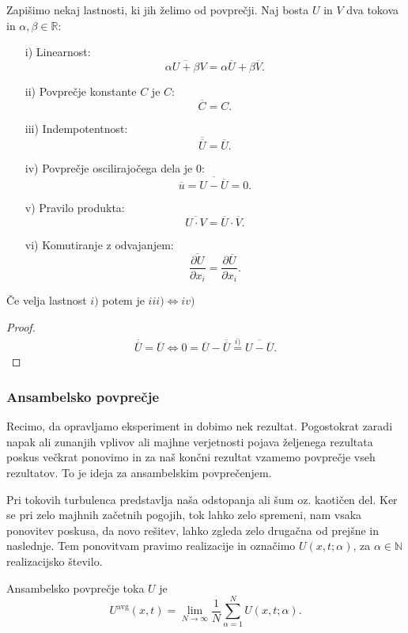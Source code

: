 \documentclass[mat2, tisk]{fmfdelo}
\newcommand{\R}{\mathbb R}
\newcommand{\N}{\mathbb N}
\begin{document}
Zapišimo nekaj lastnosti, ki jih želimo od povprečji. Naj bosta $U$ in $V$ dva tokova in 
$\alpha, \beta \in \R$:
\begin{enumerate}
  \item[i)] Linearnost: 
  $$\overline{\alpha U + \beta V} = \alpha \overline{U} + \beta\overline{V}.$$
  \item[ii)] Povprečje konstante $C$ je $C$:
  $$ \overline{C} = C.$$
  \item[iii)] Indempotentnost:
  $$ \overline{\overline{U}} = \overline{U}.$$
  \item[iv)] Povprečje oscilirajočega dela je $0$:
  $$ \overline{u} = \overline{U - \overline{U}} = 0.$$
  \item[v)] Pravilo produkta: 
  $$ \overline{U\cdot V} = \overline{U}\cdot \overline{V}. $$
  \item[vi)] Komutiranje z odvajanjem:
  $$ \overline{\frac{\partial U}{\partial x_i}} = \frac{\partial \overline{U}}{\partial x_i}.$$
\end{enumerate}

\begin{lema}
Če velja lastnost $i)$ potem je $iii) \iff iv)$
\end{lema}

\begin{proof}
\begin{align*}
\overline{\overline{U}} = \overline{U} \iff 0 = \overline{U} - \overline{\overline{U}} \stackrel{i)}{=} 
\overline{U - \overline{U}}.
\end{align*}
\end{proof}


\subsubsection{Ansambelsko povprečje}
Recimo, da opravljamo eksperiment in dobimo nek rezultat. Pogostokrat zaradi napak ali 
zunanjih vplivov ali majhne verjetnosti pojava željenega rezultata poskus večkrat ponovimo in 
za naš končni rezultat vzamemo povprečje vseh rezultatov. To je ideja za ansambelskim 
povprečenjem.

Pri tokovih turbulenca predstavlja naša odstopanja ali šum oz. kaotičen del.
Ker se pri zelo majhnih začetnih pogojih, tok lahko zelo spremeni, nam vsaka ponovitev 
poskusa, da novo rešitev, lahko zgleda zelo drugačna od prejšne in naslednje. 
Tem ponovitvam pravimo realizacije in označimo $U(x, t; \alpha)$, za $\alpha \in \N$
realizacijsko število. 
\begin{definicija}
Ansambelsko povprečje toka $U$ je 
\begin{equation}
U^\text{avg}(x, t) = \lim_{N\rightarrow \infty} \frac{1}{N}\sum_{\alpha=1}^N U(x, t;\alpha). 
\end{equation}
\end{definicija}
\end{document}
